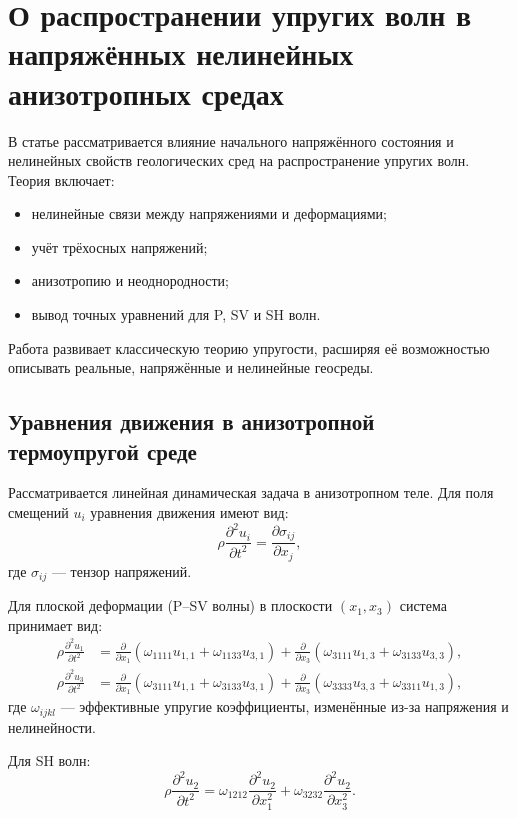 \section{ О распространении упругих волн в напряжённых нелинейных анизотропных средах}

В статье рассматривается влияние начального напряжённого состояния и нелинейных свойств геологических сред на распространение упругих волн. Теория включает:

\begin{itemize}
    \item нелинейные связи между напряжениями и деформациями;
    \item учёт трёхосных напряжений;
    \item анизотропию и неоднородности;
    \item вывод точных уравнений для P, SV и SH волн.
\end{itemize}

Работа развивает классическую теорию упругости, расширяя её возможностью описывать реальные, напряжённые и нелинейные геосреды.

\subsection*{Уравнения движения в анизотропной термоупругой среде}

Рассматривается линейная динамическая задача в анизотропном теле. Для поля смещений $u_i$ уравнения движения имеют вид:
\[
\rho \frac{\partial^2 u_i}{\partial t^2}
=
\frac{\partial \sigma_{ij}}{\partial x_j},
\]
где $\sigma_{ij}$ — тензор напряжений.

Для плоской деформации (P–SV волны) в плоскости $(x_1, x_3)$ система принимает вид:
\begin{align}
\rho \frac{\partial^2 u_1}{\partial t^2} &=
\frac{\partial}{\partial x_1}(\omega_{1111} u_{1,1} + \omega_{1133} u_{3,1}) +
\frac{\partial}{\partial x_3}(\omega_{3111} u_{1,3} + \omega_{3133} u_{3,3}), \\
\rho \frac{\partial^2 u_3}{\partial t^2} &=
\frac{\partial}{\partial x_1}(\omega_{3111} u_{1,1} + \omega_{3133} u_{3,1}) +
\frac{\partial}{\partial x_3}(\omega_{3333} u_{3,3} + \omega_{3311} u_{1,3}),
\end{align}
где $\omega_{ijkl}$ — эффективные упругие коэффициенты, изменённые из-за напряжения и нелинейности.

Для SH волн:
\[
\rho \frac{\partial^2 u_2}{\partial t^2}
=
\omega_{1212} \frac{\partial^2 u_2}{\partial x_1^2}
+
\omega_{3232} \frac{\partial^2 u_2}{\partial x_3^2}.
\]

